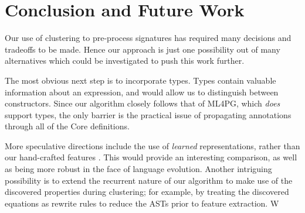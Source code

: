 \section{Conclusion and Future Work}
\label{sec:conclusion}

Our use of clustering to pre-process \quickspec{} signatures has required many
decisions and tradeoffs to be made. Hence our approach is just one possibility
out of many alternatives which could be investigated to push this work further.

The most obvious next step is to incorporate types. Types contain valuable
information about an expression, and would allow us to distinguish between
constructors. Since our algorithm closely follows that of ML4PG, which
\emph{does} support types, the only barrier is the practical issue of
propagating annotations through all of the Core definitions.

More speculative directions include the use of \emph{learned} representations,
rather than our hand-crafted features \cite{bengio2013representation}. This
would provide an interesting comparison, as well as being more robust in the
face of language evolution. Another intriguing possibility is to extend the
recurrent nature of our algorithm to make use of the discovered properties
during clustering; for example, by treating the discovered equations as rewrite
rules to reduce the ASTs prior to feature extraction.
\fi
W
